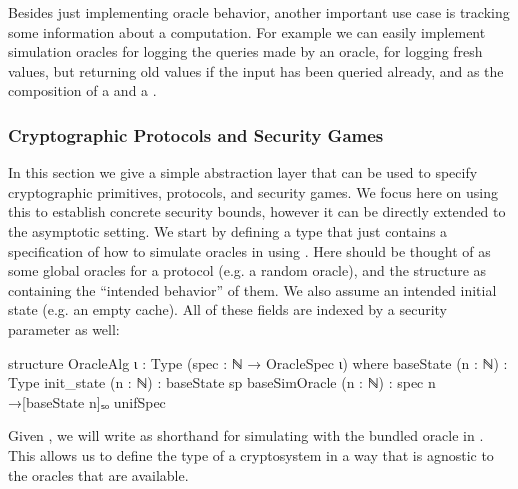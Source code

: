 Besides just implementing oracle behavior, another important use case
is tracking some information about a computation.
For example we can easily implement simulation oracles  for logging the queries made by an oracle,  for logging fresh values, but returning old values if the input has been queried already, and  as the composition of a  and a .

\subsubsection{Cryptographic Protocols and Security Games} \label{sec:protocols}
In this section we give a simple abstraction layer that can be used to specify cryptographic primitives, protocols, and security games.
We focus here on using this to establish concrete security bounds, however it can be directly extended to the asymptotic setting.
We start by defining a type  that just contains a specification of how to simulate oracles in  using .
Here  should be thought of as some global oracles for a protocol (e.g. a random oracle), and the structure as containing the ``intended behavior'' of them.
We also assume an intended initial state (e.g. an empty cache).
All of these fields are indexed by a security parameter as well:
\begin{leancode}
  structure OracleAlg {ι : Type} (spec : ℕ → OracleSpec ι) where
    baseState (n : ℕ) : Type
    init_state (n : ℕ) : baseState sp
    baseSimOracle (n : ℕ) : spec n →[baseState n]ₛₒ unifSpec
\end{leancode}
Given , we will write  as shorthand for simulating  with the bundled oracle in .
This allows us to define the type of a cryptosystem in a way that is agnostic to the oracles that are available.

